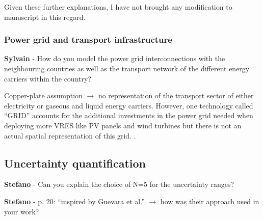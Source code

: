 \documentclass[12pt,a4paper]{article}
\begin{document}
Given these further explanations, I have not brought any modification to manuscript in this regard.

\subsubsection{Power grid and transport infrastructure}

\begin{mdframed}[style=comment] %
{\color{purple} \textbf{Sylvain}} - How do you model the power grid interconnections with the neighbouring countries as well as the transport network of the different energy carriers within the country?
\end{mdframed}

\noindent Copper-plate assumption $\rightarrow$ no representation of the transport sector of either electricity or gaseous and liquid energy carriers. However, one technology called ``GRID'' accounts for the additional investments in the power grid needed when deploying more VRES like PV panels and wind turbines but there is not an actual spatial representation of this grid. {\color{blue} }.

\begin{mdframed}[style=manuscript] %

\end{mdframed}

\subsection{Uncertainty quantification}
\label{methodo_UQ}

\begin{mdframed}[style=comment] %
{\color{orange} \textbf{Stefano}} - Can you explain the choice of N=5 for the uncertainty ranges?
\end{mdframed}

\noindent

\begin{mdframed}[style=manuscript] %


\end{mdframed}


\begin{mdframed}[style=comment] %
{\color{orange} \textbf{Stefano}} - p. 20: ``inspired by Guevara et al.'' $\rightarrow$ how was their approach used in your work?
\end{mdframed}
\end{document}
